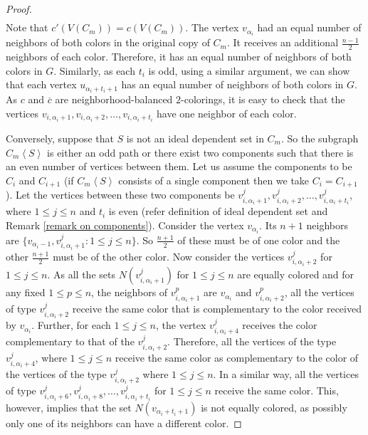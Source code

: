 \documentclass[12pt]{article}
\begin{document}
\begin{proof}
\begin{align*}
    \end{align*}
    Note that $c'(V(C_m)) = c(V(C_m))$.
    The vertex $v_{\alpha_i}$ had an equal number of neighbors of both colors in the original copy of $C_m$.
    It receives an additional $\frac{n-1}{2}$ neighbors of each color.
    Therefore, it has an equal number of neighbors of both colors in $G$.
    Similarly, as each $t_i$ is odd, using a similar argument, we can show that each vertex $u_{\alpha_i+t_i+1}$ has an equal number of neighbors of both colors in $G$.
    As $c$ and $\overline{c}$ are neighborhood-balanced $2$-colorings, it is easy to check that the vertices $v_{i,\alpha_{i}+1}, v_{i,\alpha_{i}+2}, \dots, v_{i,\alpha_{i} + t_i}$ have one neighbor of each color.
    \par
    Conversely, suppose that $S$ is not an ideal dependent set in $C_m$.
    So the subgraph $C_m\left< S \right>$ is either an odd path or there exist two components such that there is an even number of vertices between them.  
    Let us assume the components to be $C_i$ and $C_{i+1}$ (if $C_m\left< S \right>$ consists of a single component then we take $C_i=C_{i+1}$).
    Let the vertices between these two components be $v^j_{i,\alpha_i+1}, v^j_{i,\alpha_i+2}, \dots, v^j_{i,\alpha_i+t_i}$, where $1\leq j \leq n$ and $t_i$ is even (refer definition of ideal dependent set and Remark \ref{remark on components}).
    Consider the vertex $v_{\alpha_i}$.
    Its $n+1$ neighbors are $\{v_{\alpha_i-1}, v^j_{i,\alpha_i+1} : 1 \leq j \leq n \}$.
    So $\frac{n+1}{2}$ of these must be of one color and the other $\frac{n+1}{2}$ must be of the other color.
    Now consider the vertices $v^j_{i,\alpha_i+2}$ for $1\leq j \leq n$.
    As all the sets $N(v^j_{i,\alpha_i+1})$ for $1\leq j \leq n$ are equally colored and for any fixed $1 \leq p \leq n$, the neighbors of $v^p_{i,\alpha_i+1}$ are $v_{\alpha_i}$ and $v^p_{i,\alpha_i+2}$,  all the vertices of type $v^j_{i,\alpha_i+2}$ receive the same color that is complementary to the color received by $v_{\alpha_i}$.
    Further, for each  $1 \le j \le n$, the vertex $v^j_{i,\alpha_i+4}$ receives the color complementary to that of the $v^j_{i,\alpha_i+2}$.
    Therefore, all the vertices of the type $v^j_{i,\alpha_i+4}$, where $1 \le j \le n$ receive the same color as complementary to the color of the vertices of the type $v^j_{i,\alpha_i+2}$ where $1\leq j \leq n$.
    In a similar way, all the vertices of type $v^j_{i,\alpha_i+6}, v^j_{i,\alpha_i+8}, \dots, v^j_{i,\alpha_i+t_i}$ for $1\leq j \leq n$ receive the same color.
    This, however, implies that the set $N(v_{\alpha_i+t_i+1})$ is not equally colored, as possibly only one of its neighbors can have a different color. 
\end{proof}
\end{document}
